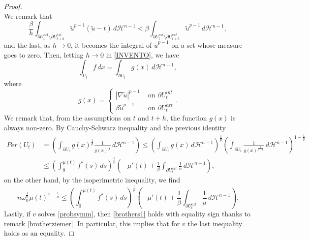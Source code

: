 \documentclass[10pt,a4paper]{amsart}
\newcommand{\abs}[1]{{\left|#1\right|}}
\newcommand{\dH}{d\mathcal{H}^{n-1}}
\begin{document}
\begin{proof}
\begin{equation}
    \end{equation}
    We remark that
    \begin{equation*}
        \frac{\beta}{h}\int_{\partial U_{t}^{ext}\setminus\partial U_{t+h}^{ext}}\tilde u^{p-1}(\tilde u-t)\,\dH<\beta\int_{\partial U_{t}^{ext}\setminus\partial U_{t+h}^{ext}}\tilde u^{p-1}\,\dH,
    \end{equation*}
    and the last, as $h\rightarrow 0$, it becomes the integral of $\tilde u^{p-1}$ on a set whose measure goes to zero. Then, letting $h\rightarrow0$ in \eqref{INVENTO}, we have
    \begin{equation*}
        \int_{U_t}f\,dx=\int_{\partial U_t}g(x)\,\dH,
    \end{equation*}
    where 
    \begin{equation*}
        g(x)=\begin{cases}
            \abs{\nabla \tilde u}^{p-1}&\text{ on }\partial U_t^{int} \\
            \beta\tilde u^{p-1}&\text{ on }\partial U_t^{ext}
        \end{cases}.
    \end{equation*}
    We remark that, from the assumptions on $t$ and $t+h$, the function $g(x)$ is always non-zero.
    By Cauchy-Schwarz inequality and the previous identity
    \begin{equation*}
        \begin{split}
            Per(U_t)&=\left(\int_{\partial U_t}g(x)^\frac{1}{p}\frac{1}{g(x)^\frac{1}{p}}\,\dH\right)\leq\left(\int_{\partial U_t}g(x)\,\dH\right)^\frac{1}{p}\left(\int_{\partial U_t}\frac{1}{g(x)^\frac{1}{p-1}}\,\dH\right)^{1-\frac{1}{p}}\\ &\leq\left(\int_0^{\mu(t)}f^\ast(s)\,ds\right)^\frac{1}{p}\left(-\mu'(t)+\frac{1}{\beta}\int_{\partial U_t^{ext}}\frac{1}{u}\,\dH\right),
        \end{split}
    \end{equation*}
    on the other hand, by the isoperimetric inequality, we find
    \begin{equation*}
        n\omega_n^\frac{1}{n}\mu(t)^{1-\frac{1}{n}}\leq\left(\int_0^{\mu(t)}f^\ast(s)\,ds\right)^\frac{1}{p}\left(-\mu'(t)+\frac{1}{\beta}\int_{\partial U_t^{ext}}\frac{1}{u}\,\dH\right).
    \end{equation*}
     Lastly, if $v$ solves \eqref{probsymm}, then \eqref{brothers1} holds with equality sign thanks to
    remark \ref{brotherziemer}. In particular, this implies that for $v$ the last inequality holds as an equality.
\end{proof}
\end{document}
